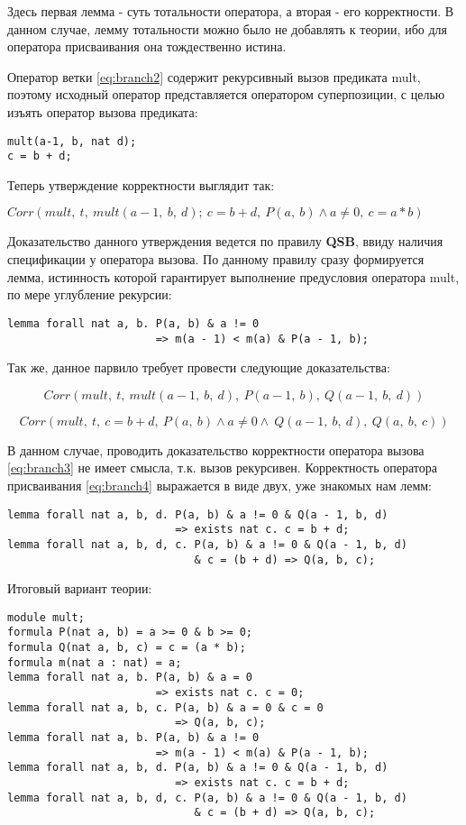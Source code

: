 \documentclass[10pt,a4paper]{article}
\newcommand{\numformula}[2] {
\begin{equation}
\label{eq:#1}
#2
\end{equation}
}
\newcommand{\lnkformula}[1] {
\eqref{eq:#1}
}
\begin{document}
Здесь первая лемма - суть тотальности оператора, а вторая - его корректности. В данном случае, лемму тотальности можно было не добавлять к теории, ибо для оператора присваивания она тождественно истина.

Оператор ветки \lnkformula{branch2} содержит рекурсивный вызов предиката mult, поэтому исходный оператор представляется оператором суперпозиции, с целью изъять оператор вызова предиката:

\begin{lstlisting}
mult(a-1, b, nat d);
c = b + d;
\end{lstlisting}

Теперь утверждение корректности выглядит так:

\begin{center}
$ Corr(mult,~t,~mult(a-1,~b,~d);~c=b+d,~P(a,~b) \land a\ne0,~c=a*b) $
\end{center}

Доказательство данного утверждения ведется по правилу \textbf{QSB}, ввиду наличия спецификации у оператора вызова. По данному правилу сразу формируется лемма, истинность которой гарантирует выполнение предусловия оператора mult, по мере углубление рекурсии:

\begin{lstlisting}
lemma forall nat a, b. P(a, b) & a != 0
                       => m(a - 1) < m(a) & P(a - 1, b);
\end{lstlisting}

Так же, данное парвило требует провести следующие доказательства:

\numformula{branch3}
{Corr(mult,~t,~mult(a-1,~b,~d),~P(a-1,~b),~Q(a-1,~b,~d))}
\numformula{branch4}
{Corr(mult,~t,~c=b+d,~P(a,~b) \land a\ne0 \land ~Q(a-1,~b,~d),~Q(a,~b,~c))}

В данном случае, проводить доказательство корректности оператора вызова \lnkformula{branch3} не имеет смысла, т.к. вызов рекурсивен. Корректность оператора присваивания \lnkformula{branch4} выражается в виде двух, уже знакомых нам лемм:

\begin{lstlisting}
lemma forall nat a, b, d. P(a, b) & a != 0 & Q(a - 1, b, d)
                          => exists nat c. c = b + d;
lemma forall nat a, b, d, c. P(a, b) & a != 0 & Q(a - 1, b, d)
                             & c = (b + d) => Q(a, b, c);
\end{lstlisting}

Итоговый вариант теории:

\begin{lstlisting}
module mult;
formula P(nat a, b) = a >= 0 & b >= 0;
formula Q(nat a, b, c) = c = (a * b);
formula m(nat a : nat) = a;
lemma forall nat a, b. P(a, b) & a = 0
                       => exists nat c. c = 0;
lemma forall nat a, b, c. P(a, b) & a = 0 & c = 0
                          => Q(a, b, c);
lemma forall nat a, b. P(a, b) & a != 0
                       => m(a - 1) < m(a) & P(a - 1, b);
lemma forall nat a, b, d. P(a, b) & a != 0 & Q(a - 1, b, d)
                          => exists nat c. c = b + d;
lemma forall nat a, b, d, c. P(a, b) & a != 0 & Q(a - 1, b, d)
                             & c = (b + d) => Q(a, b, c);
\end{lstlisting}
\end{document}
